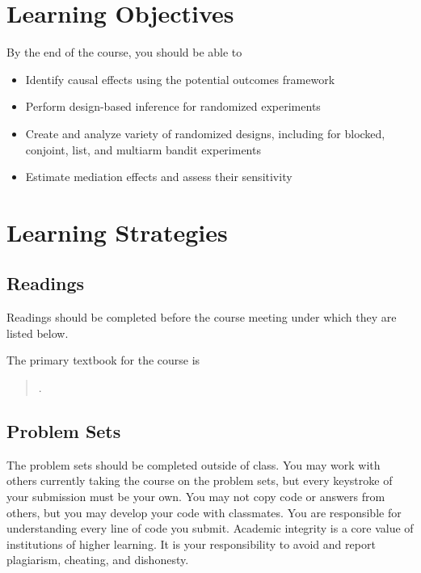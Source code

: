 \documentclass[11pt]{article}
\newcommand{\bibverse}[1]{\begin{verse} \bibentry{#1}. \end{verse}}
\begin{document}
\section*{Learning Objectives}

By the end of the course, you should be able to 

\begin{itemize}
\item Identify causal effects using the potential outcomes framework
\item Perform design-based inference for randomized experiments
\item Create and analyze variety of randomized designs, including for blocked, conjoint, list, and multiarm bandit experiments
\item Estimate mediation effects and assess their sensitivity
\end{itemize}

\section*{Learning Strategies}

\subsection*{Readings}

Readings should be completed before the course meeting under which they are listed below.  

The primary textbook for the course is 

\nobibliography*

\bibverse{gergre12}


\subsection*{Problem Sets}
The problem sets should be completed outside of class.  You may work with others currently taking the course on the problem sets, but every keystroke of your submission must be your own.  You may not copy code or answers from others, but you may develop your code with classmates.  You are responsible for understanding every line of code you submit.  Academic integrity is a core value of institutions of higher learning.
It is your responsibility to avoid and report plagiarism, cheating, and
dishonesty.  
\end{document}
